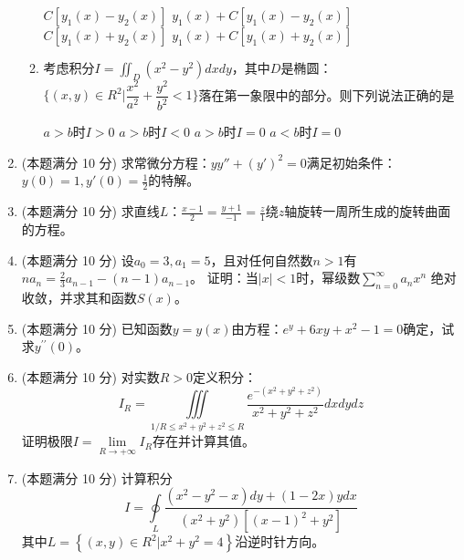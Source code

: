 \begin{enumerate}
\begin{enumerate}
\fourchoices
{$C\left[y_{1}(x)-y_{2}(x)\right]$}
{$y_{1}(x)+C\left[y_{1}(x)-y_{2}(x)\right]$}
{$C\left[y_{1}(x)+y_{2}(x)\right]$}
{$y_{1}(x)+C\left[y_{1}(x)+y_{2}(x)\right]$}

\item 
考虑积分$ I=\iint_{D}\left(x^{2}-y^{2}\right) d x d y $，其中$ D $是椭圆：$ \{(x, y) \in R^{2} | \dfrac{x^{2}}{a^{2}}+\dfrac{y^{2}}{b^{2}}<1\} $落在第一象限中的部分。则下列说法正确的是 


\fourchoices
{$ a>b $时$ I>0 $}
{$ a>b $时$ I<0 $}
{$ a>b $时$ I=0 $}
{$ a<b $时$ I=0 $}




\end{enumerate}


\item 
(本题满分 10 分)
求常微分方程：$yy''+(y')^2=0$满足初始条件：$y(0)=1,y'(0)= \frac{ 1 }{ 2 } $的特解。




\item 
(本题满分 10 分)
求直线$ L $：$ \frac{x-1}{2}=\frac{y+1}{-1}=\frac{z}{1} $绕$ z $轴旋转一周所生成的旋转曲面的方程。




\item 
(本题满分 10 分)
设$ a_0=3,a_1=5 $，且对任何自然数$ n>1 $有$ n a_{n}=\frac{2}{3} a_{n-1}-\left(n-1\right)a_{n-1} $。
证明：当$ |x|<1 $时，幂级数$ \sum\limits_{n=0}^{\infty} a_{n} x^{n} $
绝对收敛，并求其和函数$ S(x) $。




\item 
(本题满分 10 分)
已知函数$ y=y(x) $由方程：$ e^{y}+6 x y+x^{2}-1=0 $确定，试求$ y^{\prime\prime} (0) $。


\newpage
\item 
(本题满分 10 分)
对实数$ R>0 $定义积分：
\[ 
I_R=\iiint\limits_{1/R \leq x^2+y^2+z^2 \leq R}\dfrac{e^{-(x^2+y^2+z^2)}}{x^2+y^2+z^2}dxdydz
 \]
证明极限$ I=\lim \limits _{R \rightarrow+\infty} I_{R} $存在并计算其值。



\item 
(本题满分 10 分)
计算积分
\[ 
I=\oint\limits_{L} \frac{\left(x^{2}-y^{2}-x\right) d y+(1-2 x) y d x}{\left(x^{2}+y^{2}\right)\left[(x-1)^{2}+y^{2}\right]}
 \]
其中$ L=\left\{(x, y) \in R^{2} \big| x^{2}+y^{2}=4\right\} $沿逆时针方向。


\end{enumerate}
